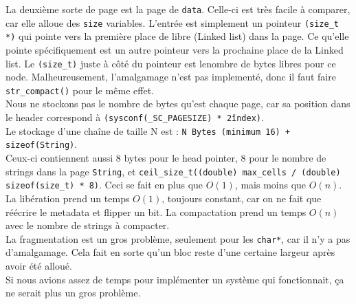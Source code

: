 \documentclass[10pt,a4paper]{article}
\begin{document}
La deuxième sorte de page est la page de \texttt{data}. Celle-ci est très facile à comparer, car 
elle alloue des \texttt{size} variables. L'entrée est simplement un pointeur \texttt{(size\_t *)} qui
pointe vers la première place de libre (Linked list) dans la page. Ce qu'elle pointe
spécifiquement est un autre pointeur vers la prochaine place de la Linked list. Le \texttt{(size\_t)}
juste à côté du pointeur est lenombre  de bytes libres pour ce node. Malheureusement, 
l'amalgamage n'est pas implementé, donc il faut faire \texttt{str\_compact()} pour le même effet.\\

Nous ne stockons pas le nombre de bytes qu'est chaque page, car sa position dans le header
correspond à \texttt{(sysconf(\_SC\_PAGESIZE) * 2\^index)}.\\

Le stockage d'une chaîne de taille N est : \texttt{N Bytes (minimum 16) + sizeof(String)}.\\
Ceux-ci contiennent aussi 8 bytes pour le head pointer, 8 pour le nombre de strings dans 
la page \texttt{String}, et \texttt{ceil\_size\_t((double) max\_cells / (double) sizeof(size\_t) * 8)}.
Ceci se fait en plus que $O(1)$, mais moins que $O(n)$.\\

La libération prend un temps $O(1)$, toujours constant, car on ne fait que réécrire le metadata et flipper un bit.
La compactation prend un temps $O(n)$ avec le nombre de strings à compacter.\\

La fragmentation est un gros problème, seulement pour les \texttt{char*}, car il n'y a pas d'amalgamage. 
Cela fait en sorte qu'un bloc reste d'une certaine largeur après avoir été alloué.\\
Si nous avions assez de temps pour implémenter un système qui fonctionnait, ça ne serait plus
un gros problème.\\
\end{document}
